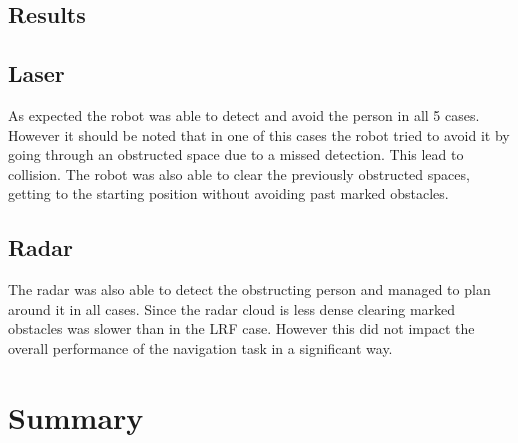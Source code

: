 \subsection{Results}
\subsection{Laser}
As expected the robot was able to detect and avoid the person in all 5 cases. However it should be noted that in one of this cases the robot tried to avoid it by going through an obstructed space due to a missed detection. This lead to collision. The robot was also able to clear the previously obstructed spaces, getting to the starting position without avoiding past marked obstacles.
\subsection{Radar}
The radar was also able to detect the obstructing person and managed to plan around it in all cases. Since the radar cloud is less dense clearing marked obstacles was slower than in the \ac{LRF} case. However this did not impact the overall performance of the navigation task in a significant way.
\section{Summary}
